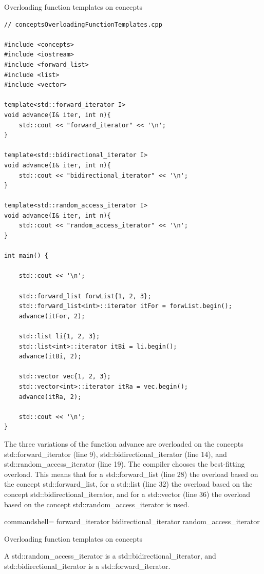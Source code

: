 \noindent
Overloading function templates on concepts
\begin{lstlisting}[style=styleCXX]
// conceptsOverloadingFunctionTemplates.cpp

#include <concepts>
#include <iostream>
#include <forward_list>
#include <list>
#include <vector>

template<std::forward_iterator I>
void advance(I& iter, int n){
	std::cout << "forward_iterator" << '\n';
}

template<std::bidirectional_iterator I>
void advance(I& iter, int n){
	std::cout << "bidirectional_iterator" << '\n';
}

template<std::random_access_iterator I>
void advance(I& iter, int n){
	std::cout << "random_access_iterator" << '\n';
}

int main() {

	std::cout << '\n';
	
	std::forward_list forwList{1, 2, 3};
	std::forward_list<int>::iterator itFor = forwList.begin();
	advance(itFor, 2);
	
	std::list li{1, 2, 3};
	std::list<int>::iterator itBi = li.begin();
	advance(itBi, 2);
	
	std::vector vec{1, 2, 3};
	std::vector<int>::iterator itRa = vec.begin();
	advance(itRa, 2);
	
	std::cout << '\n';
}
\end{lstlisting}

The three variations of the function advance are overloaded on the concepts std::forward\_iterator (line 9), std::bidirectional\_iterator (line 14), and std::random\_access\_iterator (line 19). The compiler chooses the best-fitting overload. This means that for a std::forward\_list (line 28) the overload based on the concept std::forward\_list, for a std::list (line 32) the overload based on the concept std::bidirectional\_iterator, and for a std::vector (line 36) the overload based on the concept std::random\_access\_iterator is used.

\begin{tcblisting}{commandshell={}}
forward_iterator
bidirectional_iterator
random_access_iterator
\end{tcblisting}

\begin{center}
Overloading function templates on concepts
\end{center}

A std::random\_access\_iterator is a std::bidirectional\_iterator, and std::bidirectional\_iterator is a std::forward\_iterator.

